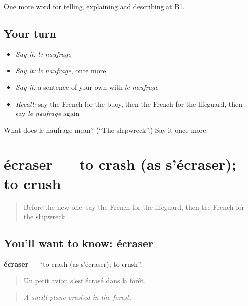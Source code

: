 \begin{grammarlens}[title={What you've built}]
One more word for telling, explaining and describing at B1.
\end{grammarlens}

\subsection*{Your turn}
\begin{itemize}
\raggedright
  \item \emph{Say it:} \emph{le naufrage}
  \item \emph{Say it:} \emph{le naufrage}, once more
  \item \emph{Say it:} a sentence of your own with \emph{le naufrage}
  \item \emph{Recall:} say the French for the buoy, then the French for the lifeguard, then say \emph{le naufrage} again
\end{itemize}

\begin{tcolorbox}[breakable,colback=teal!4,colframe=teal!35!black,title={Before you move on}]
What does le naufrage mean? (\textquotedblleft{}The shipwreck\textquotedblright{}.) Say it once more.
\end{tcolorbox}
\section[écraser]{écraser — to crash (as s'écraser); to crush}

\label{lesson:FR-C305-ecraser}



\begin{quote}
Before the new one: say the French for the lifeguard, then the French for the shipwreck.
\end{quote}

\subsection*{You'll want to know: écraser}
\textbf{écraser} — \textquotedblleft{}to crash (as s'écraser); to crush\textquotedblright{}.

\begin{quote}
Un petit avion s'est écrasé dans la forêt.
\end{quote}

\begin{quote}
\emph{A small plane crashed in the forest.}
\end{quote}

